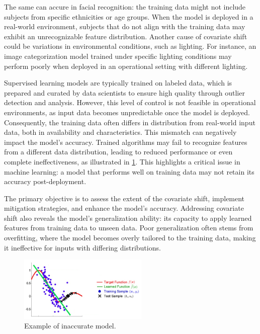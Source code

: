 The same can accure in facial recognition: the training data might not include subjects from specific ethnicities or age groups. When the model is deployed in a real-world environment, subjects that do not align with the training data may exhibit an unrecognizable feature distribution. Another cause of covariate shift could be variations in environmental conditions, such as lighting. For instance, an image categorization model trained under specific lighting conditions may perform poorly when deployed in an operational setting with different lighting.
	
Supervised learning models are typically trained on labeled data, which is prepared and curated by data scientists to ensure high quality through outlier detection and analysis. However, this level of control is not feasible in operational environments, as input data becomes unpredictable once the model is deployed. Consequently, the training data often differs in distribution from real-world input data, both in availability and characteristics. This mismatch can negatively impact the model's accuracy. Trained algorithms may fail to recognize features from a different data distribution, leading to reduced performance or even complete ineffectiveness, as illustrated in \cref{fig:inaccurate-model}. This highlights a critical issue in machine learning: a model that performs well on training data may not retain its accuracy post-deployment.

The primary objective is to assess the extent of the covariate shift, implement mitigation strategies, and enhance the model's accuracy. Addressing covariate shift also reveals the model's generalization ability: its capacity to apply learned features from training data to unseen data. Poor generalization often stems from overfitting, where the model becomes overly tailored to the training data, making it ineffective for inputs with differing distributions.

\begin{figure}[H]
	\centering
	\includegraphics[width=0.55\textwidth]{assets/covariate_shift.png} 
	\caption{Example of inaccurate model.}
	\label{fig:inaccurate-model}
\end{figure}
